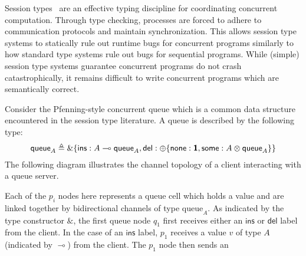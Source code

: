 Session types~\cite{honda93} are an effective typing discipline for coordinating
concurrent computation. Through type checking, processes are forced to adhere to
communication protocols and maintain synchronization. This allows session type
systems to statically rule out runtime bugs for concurrent programs similarly to
how standard type systems rule out bugs for sequential programs. While (simple)
session type systems guarantee concurrent programs do not crash catastrophically,
it remains difficult to write concurrent programs which are semantically correct.

Consider the Pfenning-style concurrent queue which is a common data structure encountered
in the session type literature. A queue is described by the following type:
\begin{align*}
  \textsf{queue}_A \triangleq \&\{
  \textsf{ins}: A \multimap \textsf{queue}_A,
  \textsf{del}: \oplus\{\textsf{none}: \textbf{\textsf{1}}, \textsf{some}: A \otimes \textsf{queue}_A\}
  \}
\end{align*}
The following diagram illustrates the channel topology of a client interacting with
a queue server.
\begin{center}
\vspace{0.4em}
\end{center}
Each of the $p_i$ nodes here represents a queue cell which holds a value and are
linked together by bidirectional channels of type $\text{queue}_A$.  As
indicated by the type constructor $\&$, the first queue node $q_1$ first
receives either an $\textsf{ins}$ or $\textsf{del}$ label from the client. In
the case of an $\textsf{ins}$ label, $p_1$ receives a value $v$ of type $A$
(indicated by $\multimap$) from the client.  The $p_1$ node then sends an

